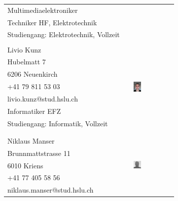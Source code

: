 \begin{tabular}{lp{3.3cm}l}
    Multimediaelektroniker                      & &  \\
    Techniker HF, Elektrotechnik                & &  \\
    Studiengang: Elektrotechnik, Vollzeit       & &  \\
                                                & &  \\
    Livio Kunz                                  & &  \multirow{8}{4cm}{\includegraphics[width=0.2\textwidth]{Sourcen/DasTeam/Bilder/LivioKunz.jpg}} \\
    Hubelmatt 7                                 & &  \\
    6206 Neuenkirch                             & &  \\
    +41 79 811 53 03                            & &  \\
    livio.kunz@stud.hslu.ch                     & &  \\
    Informatiker EFZ                            & &  \\
    Studiengang: Informatik, Vollzeit 			& &  \\
                                                & &  \\
                                                & &  \\
    Niklaus Manser                              & &  \multirow{8}{4cm}{\includegraphics[width=0.2\textwidth]{Sourcen/DasTeam/Bilder/NiklausManser.jpg}} \\
    Brunnmattstrasse 11                         & &  \\
    6010 Kriens                                 & &  \\
    +41 77 405 58 56                            & &  \\
    niklaus.manser@stud.hslu.ch                 & &  \\

\end{tabular}
